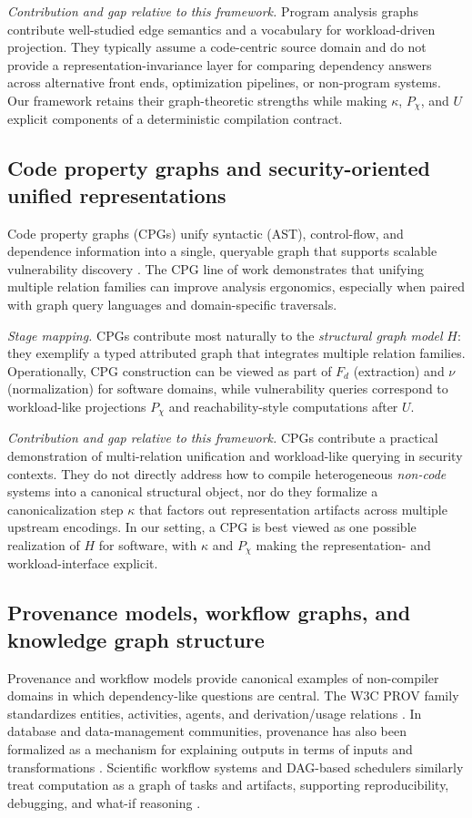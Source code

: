 \documentclass[11pt]{article}
\begin{document}
\emph{Contribution and gap relative to this framework.} Program analysis graphs contribute well-studied edge semantics and a vocabulary for workload-driven projection. They typically assume a code-centric source domain and do not provide a representation-invariance layer for comparing dependency answers across alternative front ends, optimization pipelines, or non-program systems. Our framework retains their graph-theoretic strengths while making $\kappa$, $P_\chi$, and $U$ explicit components of a deterministic compilation contract.

\subsection{Code property graphs and security-oriented unified representations}
Code property graphs (CPGs) unify syntactic (AST), control-flow, and dependence information into a single, queryable graph that supports scalable vulnerability discovery \cite{yamaguchi2014cpg}. The CPG line of work demonstrates that unifying multiple relation families can improve analysis ergonomics, especially when paired with graph query languages and domain-specific traversals.

\emph{Stage mapping.} CPGs contribute most naturally to the \emph{structural graph model} $H$: they exemplify a typed attributed graph that integrates multiple relation families. Operationally, CPG construction can be viewed as part of $F_d$ (extraction) and $\nu$ (normalization) for software domains, while vulnerability queries correspond to workload-like projections $P_\chi$ and reachability-style computations after $U$.

\emph{Contribution and gap relative to this framework.} CPGs contribute a practical demonstration of multi-relation unification and workload-like querying in security contexts. They do not directly address how to compile heterogeneous \emph{non-code} systems into a canonical structural object, nor do they formalize a canonicalization step $\kappa$ that factors out representation artifacts across multiple upstream encodings. In our setting, a CPG is best viewed as one possible realization of $H$ for software, with $\kappa$ and $P_\chi$ making the representation- and workload-interface explicit.

\subsection{Provenance models, workflow graphs, and knowledge graph structure}
Provenance and workflow models provide canonical examples of non-compiler domains in which dependency-like questions are central. The W3C PROV family standardizes entities, activities, agents, and derivation/usage relations \cite{w3cprov}. In database and data-management communities, provenance has also been formalized as a mechanism for explaining outputs in terms of inputs and transformations \cite{buneman2001,cheney2009}. Scientific workflow systems and DAG-based schedulers similarly treat computation as a graph of tasks and artifacts, supporting reproducibility, debugging, and what-if reasoning \cite{deelman2009}.
\end{document}

